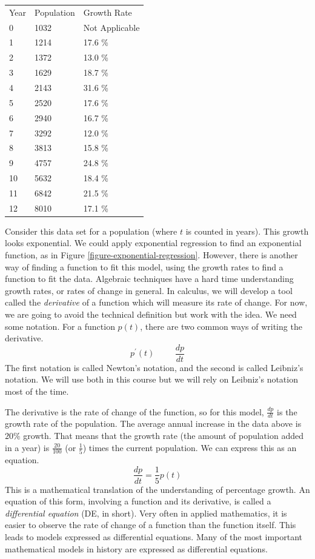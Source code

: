 \documentclass[fleqn]{report}
\begin{document}
\begin{table}[h]
\begin{tabular}{lll}
Year & Population & Growth Rate
\vspace{.3cm} \\
0 & 1032 & Not Applicable \\
1 & 1214 & 17.6 \% \\
2 & 1372 & 13.0 \% \\
3 & 1629 & 18.7 \% \\
4 & 2143 & 31.6 \% \\
5 & 2520 & 17.6 \% \\
6 & 2940 & 16.7 \% \\
7 & 3292 & 12.0 \% \\
8 & 3813 & 15.8 \% \\
9 & 4757 & 24.8 \% \\
10 & 5632 & 18.4 \% \\
11 & 6842 & 21.5 \% \\
12 & 8010 & 17.1 \% 
\end{tabular}
\end{table}

Consider this data set for a population (where $t$ is
counted in years). This growth looks exponential. We could
apply exponential regression to find an exponential function,
as in Figure \ref{figure-exponential-regression}.  However, there
is another way of finding a function to fit this model, using
the growth rates to find a function to fit the data. Algebraic
techniques have a hard time understanding growth rates, or
rates of change in general. In calculus, we will develop a
tool called the \emph{derivative} of a function which will
measure its rate of change. For now, we are going to avoid the
technical definition but work with the idea. We need some
notation. For a function $p(t)$, there are two common ways of
writing the derivative.
\begin{equation*}
p^\prime(t) \hspace{1cm} \frac{dp}{dt}
\end{equation*}
The first notation is called Newton's notation, and the second
is called Leibniz's notation. We will use both in this course
but we will rely on Leibniz's notation most of the time.

The derivative is the rate of change of the function, so for
this model, $\frac{dp}{dt}$ is the growth rate of the
population. The average annual increase in the data above is
$20\%$ growth. That means that the growth rate (the amount of
population added in a year) is $\frac{20}{100}$ (or
$\frac{1}{5}$) times the
current population. We can express this as an equation.
\begin{equation*}
\frac{dp}{dt} = \frac{1}{5} p(t)
\end{equation*}
This is a mathematical translation of the understanding of
percentage growth. An equation of this form, involving a
function and its derivative, is called a \emph{differential
equation} (DE, in short). Very often in applied mathematics,
it is easier to observe the rate of change of a function than
the function itself. This leads to models expressed as 
differential equations. Many of the most important
mathematical models in history are expressed as differential
equations.
\end{document}
